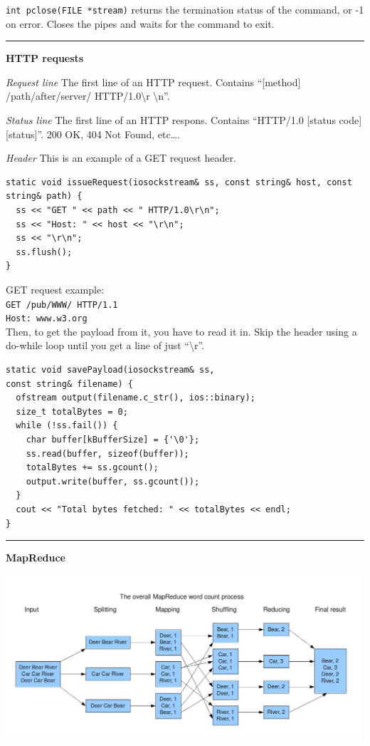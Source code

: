 \documentclass{article}
\begin{document}
\begin{multicols}{2}
  {\tt int pclose(FILE *stream)} returns the termination status of the command,
  or -1 on error. Closes the pipes and waits for the command to exit.

  \noindent\rule{4cm}{0.4pt}

  {\bf HTTP requests}

  {\it Request line} The first line of an HTTP request. Contains ``[method]
  /path/after/server/ HTTP/1.0\textbackslash r \textbackslash n''.

  {\it Status line} The first line of an HTTP respons. Contains ``HTTP/1.0
  [status code] [status]''. 200 OK, 404 Not Found, etc\dots.

  {\it Header}
  This is an example of a GET request header.
  \begin{verbatim}
static void issueRequest(iosockstream& ss, const string& host, const string& path) {
  ss << "GET " << path << " HTTP/1.0\r\n";
  ss << "Host: " << host << "\r\n";
  ss << "\r\n";
  ss.flush();
}  \end{verbatim}
  GET request example:\\
  {\tt GET /pub/WWW/ HTTP/1.1\\
  Host: www.w3.org}\\
  Then, to get the payload from it, you have to read it in. Skip the header
  using a do-while loop until you get a line of just ``\textbackslash r''.
  \begin{verbatim}
static void savePayload(iosockstream& ss,
const string& filename) {
  ofstream output(filename.c_str(), ios::binary);
  size_t totalBytes = 0;
  while (!ss.fail()) {
    char buffer[kBufferSize] = {'\0'};
    ss.read(buffer, sizeof(buffer));
    totalBytes += ss.gcount();
    output.write(buffer, ss.gcount());
  }
  cout << "Total bytes fetched: " << totalBytes << endl;
}
  \end{verbatim}

  \noindent\rule{4cm}{0.4pt}

  {\bf MapReduce}
\end{multicols}
  \includegraphics[width=500px]{mr.png}
\end{document}
